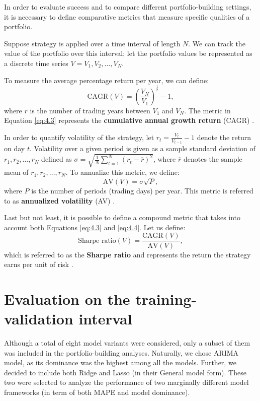 In order to evaluate success and to compare different portfolio-building settings, it
is necessary to define comparative metrics that measure specific qualities of a portfolio.

Suppose strategy is applied over a time interval of length $N$. We can track the value of the portfolio over this interval; let
the portfolio values be represented as a discrete time series $V = V_1, V_2, \ldots, V_N$.

To measure the average percentage return per year, we can define:
\begin{equation}
    \label{eq:4.3}
    \text{CAGR}(V) = \left(\frac{V_N}{V_1}\right)^ {\frac{1}{r}} - 1 ,
\end{equation}
where $r$ is the number of trading years between $V_1$ and $V_N$. The metric in Equation \eqref{eq:4.3} represents the \textbf{cumulative annual growth return} (CAGR) \cite{portfolio}.

In order to quantify volatility of the strategy, let $r_t = \frac{V_t}{V_{t-1}} - 1$ denote the return on day $t$. Volatility over a given
period is given as a sample standard deviation of $r_1, r_2, \ldots, r_N$ defined as $\sigma = \sqrt{\frac{1}{N}\sum_{t=1}^N (r_t - \overline{r})^2}$, where $\overline{r}$ denotes
the sample mean of $r_1, r_2, \ldots, r_N$. To annualize this metric, we define:
\begin{equation}
    \label{eq:4.4}
    \text{AV}(V) = \sigma \sqrt{P},
\end{equation}
where $P$ is the number of periods (trading days) per year. This metric is referred to as \textbf{annualized volatility} (AV) \cite{portfolio}.

Last but not least, it is possible to define a compound metric that takes into account both Equations \eqref{eq:4.3} and \eqref{eq:4.4}. Let us define:
\begin{equation}
    \text{Sharpe ratio}(V) = \frac{\text{CAGR}(V)}{\text{AV}(V)},
\end{equation}
which is referred to as the \textbf{Sharpe ratio} and represents the return the strategy earns per unit of risk \cite{portfolio}.

\section{Evaluation on the training-validation interval}
Although a total of eight model variants were considered, only a subset of them was included in the portfolio-building analyses. Naturally, we chose ARIMA model, as its dominance was the highest among 
all the models. Further, we decided to include both Ridge and Lasso (in their General model form). These two were selected to analyze the performance of two marginally different model frameworks (in term of both MAPE and model dominance).

